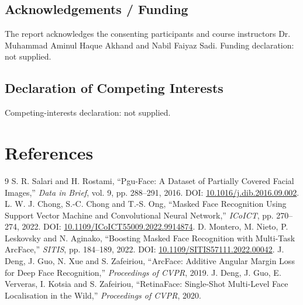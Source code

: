 \documentclass[11pt,a4paper]{article}
\newcommand{\nextpage}{\clearpage}
\begin{document}
\subsection{Acknowledgements / Funding}
The report acknowledges the consenting participants and course instructors Dr. Muhammad Aminul Haque Akhand and Nabil Faiyaz Sadi. Funding declaration: not supplied.
\subsection{Declaration of Competing Interests}
Competing-interests declaration: not supplied.

\nextpage
\section{References}
\begingroup{}\small
\renewcommand{\section}[2]{}%
\begin{thebibliography}{9}
 S. R. Salari and H. Rostami, ``Pgu-Face: A Dataset of Partially Covered Facial Images,'' \textit{Data in Brief}, vol. 9, pp. 288--291, 2016. DOI: \href{https://doi.org/10.1016/j.dib.2016.09.002}{10.1016/j.dib.2016.09.002}.
 L. W. J. Chong, S.-C. Chong and T.-S. Ong, ``Masked Face Recognition Using Support Vector Machine and Convolutional Neural Network,'' \textit{ICoICT}, pp. 270--274, 2022. DOI: \href{https://doi.org/10.1109/ICoICT55009.2022.9914874}{10.1109/ICoICT55009.2022.9914874}.
 D. Montero, M. Nieto, P. Leskovsky and N. Aginako, ``Boosting Masked Face Recognition with Multi-Task ArcFace,'' \textit{SITIS}, pp. 184--189, 2022. DOI: \href{https://doi.org/10.1109/SITIS57111.2022.00042}{10.1109/SITIS57111.2022.00042}.
 J. Deng, J. Guo, N. Xue and S. Zafeiriou, ``ArcFace: Additive Angular Margin Loss for Deep Face Recognition,'' \textit{Proceedings of CVPR}, 2019.
 J. Deng, J. Guo, E. Ververas, I. Kotsia and S. Zafeiriou, ``RetinaFace: Single-Shot Multi-Level Face Localisation in the Wild,'' \textit{Proceedings of CVPR}, 2020.
\end{thebibliography}
\endgroup
\end{document}
